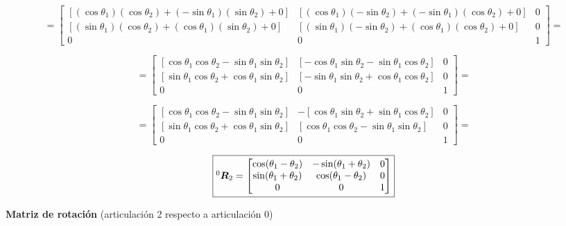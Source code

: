\documentclass[10pt,letterpaper]{LabHMO}
\begin{document}
{\begin{equation}
	=\begin{bmatrix}
		[(\cos\theta_1)(\cos\theta_2)+(-\sin\theta_1)(\sin\theta_2)+0] & [(\cos\theta_1)(-\sin\theta_2)+(-\sin\theta_1)(\cos\theta_2)+0] & 0\\
		[(\sin\theta_1)(\cos\theta_2)+(\cos\theta_1)(\sin\theta_2)+0] & [(\sin\theta_1)(-\sin\theta_2)+(\cos\theta_1)(\cos\theta_2)+0] & 0\\
		0&0&1
	\end{bmatrix}=
\end{equation}

\begin{equation}
	=\begin{bmatrix}
		[\cos\theta_1\cos\theta_2-\sin\theta_1\sin\theta_2] & [-\cos\theta_1\sin\theta_2-\sin\theta_1\cos\theta_2] & 0\\
		[\sin\theta_1\cos\theta_2+\cos\theta_1\sin\theta_2] & [-\sin\theta_1\sin\theta_2+\cos\theta_1\cos\theta_2] & 0\\
		0&0&1
	\end{bmatrix}=
\end{equation}

\begin{equation}
	=\begin{bmatrix}
		[\cos\theta_1\cos\theta_2-\sin\theta_1\sin\theta_2] & -[\cos\theta_1\sin\theta_2+\sin\theta_1\cos\theta_2] & 0\\
		[\sin\theta_1\cos\theta_2+\cos\theta_1\sin\theta_2] & [\cos\theta_1\cos\theta_2-\sin\theta_1\sin\theta_2] & 0\\
		0&0&1
	\end{bmatrix}=
\end{equation}

\begin{equation}
	\fbox{$^0\boldsymbol{R}_2=\begin{bmatrix}
		\cos(\theta_1-\theta_2) & -\sin(\theta_1+\theta_2) & 0\\
		\sin(\theta_1+\theta_2) & \cos(\theta_1-\theta_2) & 0\\
		0&0&1\\
	\end{bmatrix}$}
\end{equation}

\centerline{\textbf{Matriz de rotación} (articulación 2 respecto a articulación 0)}
}
\end{document}
